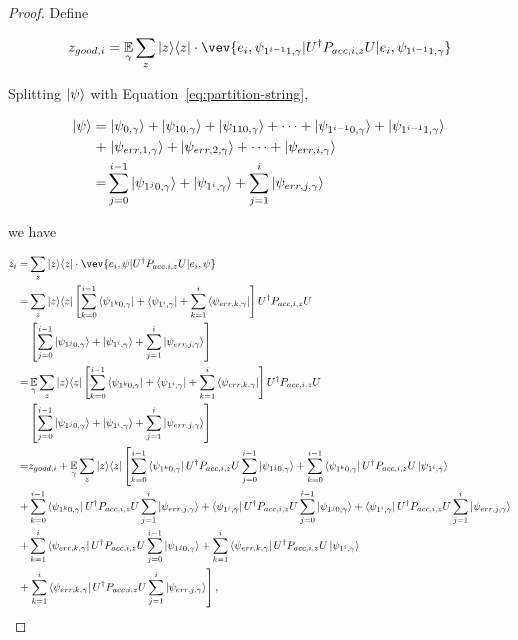 \begin{proof}
Define 

\begin{align}
    z_{good,i}=\E_\gamma \sum_z \proj{z} \cdot \vev{e_i,\psi_{1^{i-1}1,\gamma}|U^\dag P_{acc,i,z} U|e_i,\psi_{1^{i-1}1,\gamma}}
\end{align}

Splitting $\ket{\psi}$ with Equation~\ref{eq:partition-string}, 

\begin{align}
    \ket{\psi}=& \left. \ket{\psi_{0,\gamma}}+\ket{\psi_{10,\gamma}}+\ket{\psi_{110,\gamma}}+\cdots+\ket{\psi_{1^{i-1}0,\gamma}}+
    \ket{\psi_{1^{i-1}1,\gamma}} \right. \nonumber \\
     +& \left.\ket{\psi_{err,1,\gamma}}+\ket{\psi_{err,2,\gamma}}+\cdots+\ket{\psi_{err,i,\gamma}}\right. \nonumber \\
     =& \sum_{j=0}^{i-1} \ket{\psi_{1^j0,\gamma}} +\ket{\psi_{1^i,\gamma}} +\sum_{j=1}^{i}\ket{\psi_{err,j,\gamma}}
\end{align}


we have 

\begin{align}
    z_i =& \sum_z \proj{z} \cdot \vev{e_i,\psi|U^\dag P_{acc,i,z} U|e_i,\psi} \nn \\
    =& \sum_z \proj{z} \L[\sum_{k=0}^{i-1} \bra{\psi_{1^k0,\gamma}} +\bra{\psi_{1^i,\gamma}} +\sum_{k=1}^{i}\bra{\psi_{err,k,\gamma}} \R]U^\dag  P_{acc,i,z} U\nn \\
    &\L[ \sum_{j=0}^{i-1} \ket{\psi_{1^j0,\gamma}} +\ket{\psi_{1^i,\gamma}} +\sum_{j=1}^{i}\ket{\psi_{err,j,\gamma}}\R]  \nn \\
    =& \E_\gamma \sum_z \proj{z} \L[\sum_{k=0}^{i-1} \bra{\psi_{1^k0,\gamma}} +\bra{\psi_{1^i,\gamma}} +\sum_{k=1}^{i}\bra{\psi_{err,k,\gamma}} \R]U^\dag  P_{acc,i,z} U\nn \\
    &\L[ \sum_{j=0}^{i-1} \ket{\psi_{1^j0,\gamma}} +\ket{\psi_{1^i,\gamma}} +\sum_{j=1}^{i}\ket{\psi_{err,j,\gamma}}\R]  \nn \\
    =& z_{good,i}+ \E_\gamma \sum_z \proj{z} \L[\sum_{k=0}^{i-1} \bra{\psi_{1^k0,\gamma}}U^\dag  P_{acc,i,z}U   \sum_{j=0}^{i-1} \ket{\psi_{1^j0,\gamma}}+
    \sum_{k=0}^{i-1} \bra{\psi_{1^k0,\gamma}}U^\dag  P_{acc,i,z}U \ket{\psi_{1^i,\gamma}}  \R. \nn \\
      +&  \sum_{k=0}^{i-1} \bra{\psi_{1^k0,\gamma}}U^\dag  P_{acc,i,z}U\sum_{j=1}^{i}\ket{\psi_{err,j,\gamma}}
    +\bra{\psi_{1^i,\gamma}} U^\dag  P_{acc,i,z}U \sum_{j=0}^{i-1} \ket{\psi_{1^j0,\gamma}}
    +\bra{\psi_{1^i,\gamma}} U^\dag  P_{acc,i,z}U \sum_{j=1}^{i}\ket{\psi_{err,j,\gamma}} \nn \\
    +& \sum_{k=1}^{i}\bra{\psi_{err,k,\gamma}} U^\dag  P_{acc,i,z}U  \sum_{j=0}^{i-1} \ket{\psi_{1^j0,\gamma}} 
    +\sum_{k=1}^{i}\bra{\psi_{err,k,\gamma}} U^\dag  P_{acc,i,z}U \ket{\psi_{1^i,\gamma}} \nn \\
    +&\L.\sum_{k=1}^{i}\bra{\psi_{err,k,\gamma}} U^\dag  P_{acc,i,z}U \sum_{j=1}^{i}\ket{\psi_{err,j,\gamma}} \R] , \nn     
\end{align}


\end{proof}
